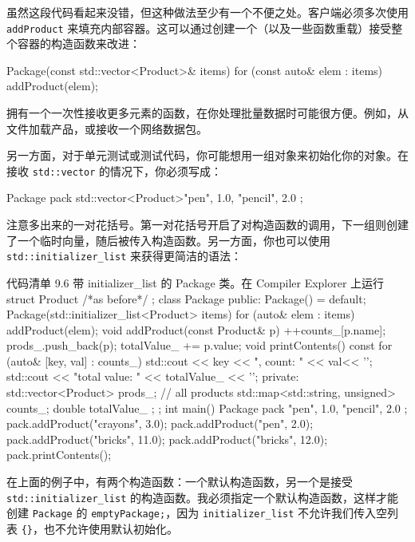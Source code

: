 虽然这段代码看起来没错，但这种做法至少有一个不便之处。客户端必须多次使用 \texttt{addProduct} 来填充内部容器。这可以通过创建一个（以及一些函数重载）接受整个容器的构造函数来改进：

\begin{codebox}[cpp]
Package(const std::vector<Product>& items) {
    for (const auto& elem : items)
        addProduct(elem);
}
\end{codebox}

拥有一个一次性接收更多元素的函数，在你处理批量数据时可能很方便。例如，从文件加载产品，或接收一个网络数据包。

另一方面，对于单元测试或测试代码，你可能想用一组对象来初始化你的对象。在接收 \texttt{std::vector} 的情况下，你必须写成：

\begin{codebox}[cpp]
Package pack {
    std::vector<Product>{{"pen", 1.0}, {"pencil", 2.0}}
};
\end{codebox}

注意多出来的一对花括号。第一对花括号开启了对构造函数的调用，下一组则创建了一个临时向量，随后被传入构造函数。另一方面，你也可以使用 \texttt{std::initializer\_list} 来获得更简洁的语法：

\begin{codeboxt}[cpp]{代码清单 9.6 带 initializer\_list 的 Package 类。在 Compiler Explorer 上运行}
struct Product { /*as before*/ };
class Package {
public:
    Package() = default;
    Package(std::initializer_list<Product> items) {
        for (auto& elem : items)
            addProduct(elem);
    }
    void addProduct(const Product& p) {
        ++counts_[p.name];
        prods_.push_back(p);
        totalValue_ += p.value;
    }
    void printContents() const {
        for (auto& [key, val] : counts_)
            std::cout << key << ", count: " << val<< '\n';
        std::cout << "total value: " << totalValue_ << '\n';
    }
private:
    std::vector<Product> prods_; // all products
    std::map<std::string, unsigned> counts_;
    double totalValue_ { };
};
int main() {
    Package pack {
        {"pen", 1.0}, {"pencil", 2.0}
    };
    pack.addProduct({"crayons", 3.0});
    pack.addProduct({"pen", 2.0});
    pack.addProduct({"bricks", 11.0});
    pack.addProduct({"bricks", 12.0});
    pack.printContents();
}
\end{codeboxt}

在上面的例子中，有两个构造函数：一个默认构造函数，另一个是接受 \texttt{std::initializer\_list} 的构造函数。我必须指定一个默认构造函数，这样才能创建 \texttt{Package} 的 \texttt{emptyPackage;}，因为 \texttt{initializer\_list} 不允许我们传入空列表 \texttt{\{\}}，也不允许使用默认初始化。

